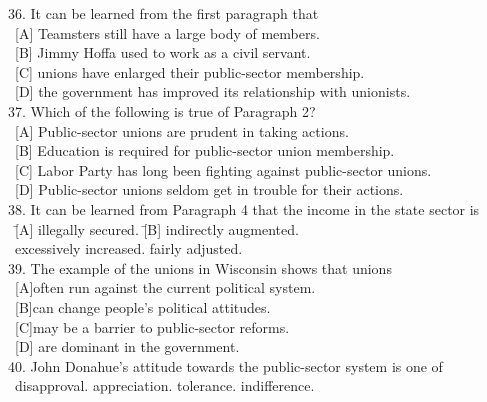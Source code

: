 \begin{tabbing}
36. It can be learned from the first paragraph that\\
\ [A] Teamsters still have a large body of members.\\
\ [B] Jimmy Hoffa used to work as a civil servant.\\
\ [C] unions have enlarged their public-sector membership.\\
\ [D] the government has improved its relationship with unionists.\\
37. Which of the following is true of Paragraph 2?\\
\ [A] Public-sector unions are prudent in taking actions.\\
\ [B] Education is required for public-sector union membership.\\
\ [C] Labor Party has long been fighting against public-sector unions.\\
\ [D] Public-sector unions seldom get in trouble for their actions.\\
38. It can be learned from Paragraph 4 that the income in the state sector is\\
\ \= [A] illegally secured. \quad\quad\quad\quad\quad\quad\quad\quad\= [B] indirectly augmented.\\
\ \> [C] excessively increased. \> [D] fairly adjusted.\\
39. The example of the unions in Wisconsin shows that unions\\
\ [A]often run against the current political system.\\
\ [B]can change people’s political attitudes.\\
\ [C]may be a barrier to public-sector reforms.\\
\ [D] are dominant in the government.\\
40. John Donahue’s attitude towards the public-sector system is one of\\
\ \> [A] disapproval. \quad [B] appreciation. \> [C] tolerance. \quad [D] indifference. 
\end{tabbing}
